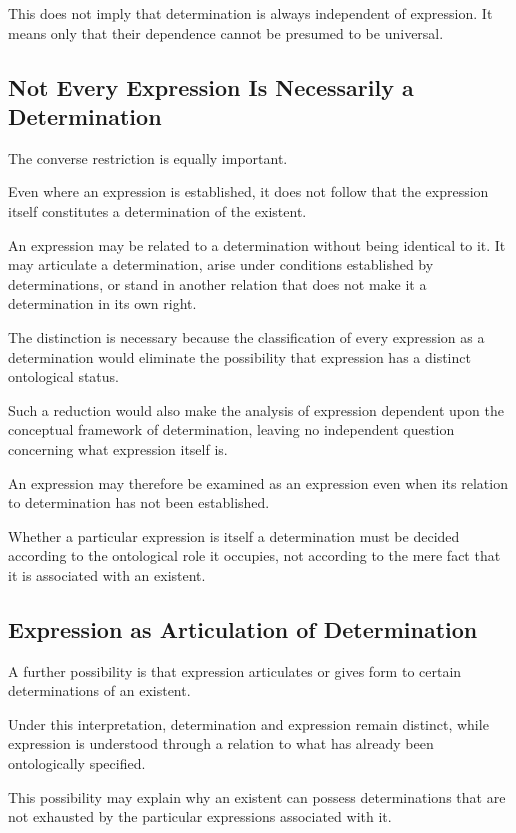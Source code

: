 This does not imply that determination is always
independent of expression. It means only that
their dependence cannot be presumed to be universal.

\subsection{Not Every Expression Is Necessarily a Determination}

The converse restriction is equally important.

Even where an expression is established, it does
not follow that the expression itself constitutes
a determination of the existent.

An expression may be related to a determination
without being identical to it. It may articulate
a determination, arise under conditions established
by determinations, or stand in another relation
that does not make it a determination in its own right.

The distinction is necessary because the classification
of every expression as a determination would eliminate
the possibility that expression has a distinct
ontological status.

Such a reduction would also make the analysis
of expression dependent upon the conceptual
framework of determination, leaving no independent
question concerning what expression itself is.

An expression may therefore be examined as an
expression even when its relation to determination
has not been established.

Whether a particular expression is itself a
determination must be decided according to
the ontological role it occupies, not according
to the mere fact that it is associated with
an existent.

\subsection{Expression as Articulation of Determination}

A further possibility is that expression articulates
or gives form to certain determinations of an existent.

Under this interpretation, determination and
expression remain distinct, while expression
is understood through a relation to what has
already been ontologically specified.

This possibility may explain why an existent can
possess determinations that are not exhausted
by the particular expressions associated with it.


